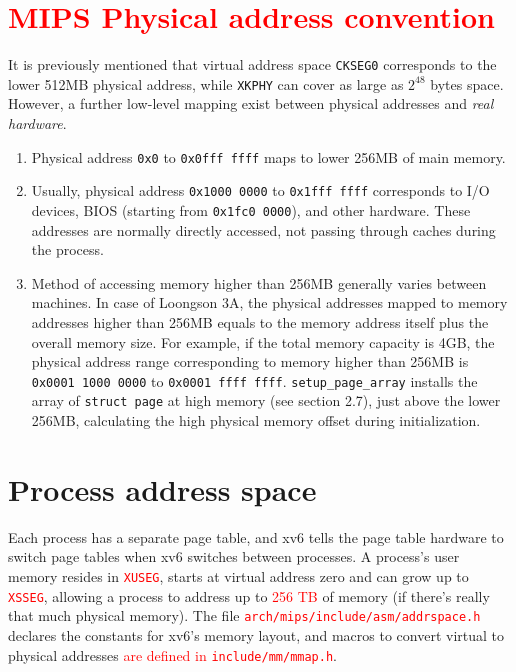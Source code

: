 \documentclass{report}
\def \hilite#1{\textcolor{red}{#1}}
\newenvironment{hilight}{\color{red}}{\color{black}}
\begin{document}
	\section{\hilite{MIPS Physical address convention}}
	\begin{hilight}
		It is previously mentioned that virtual address space \texttt{CKSEG0} corresponds to the lower
		512MB physical address, while \texttt{XKPHY} can cover as large as $2^48$ bytes space.  However,
		a further low-level mapping exist between physical addresses and \emph{real hardware}.
		
		\begin{enumerate}
			\item Physical address \texttt{0x0} to \texttt{0x0fff ffff} maps to lower
			256MB of main memory.
			\item Usually, physical address \texttt{0x1000 0000} to \texttt{0x1fff ffff} corresponds to
			I/O devices, BIOS (starting from \texttt{0x1fc0 0000}), and other hardware.  These addresses
			are normally directly accessed, not passing through caches during the process.
			\item Method of accessing memory higher than 256MB generally varies between machines.
			In case of Loongson 3A, the physical addresses mapped to memory addresses higher than
			256MB equals to the memory address itself plus the overall memory size.  For example, if the
			total memory capacity is 4GB, the physical address range corresponding to memory higher than
			256MB is \texttt{0x0001 1000 0000} to \texttt{0x0001 ffff ffff}.  \texttt{setup\_page\_array}
			\marginpar{
				\footnotesize\ttfamily
				\hilite{arch/mips/mach/\\loongson3a5/mm.c:14}
			}
			installs the array of \texttt{struct page} at high memory (see section 2.7), just above the lower 256MB,
			calculating the high physical memory offset during initialization.
		\end{enumerate}
	\end{hilight}
	
	\section{Process address space}
	Each process has a separate page table, and xv6 tells the page table hardware to
	switch page tables when xv6 switches between processes. A
	process's user memory resides in \hilite{\texttt{XUSEG}}, starts at virtual address zero 
	and can grow up to \hilite{\texttt{XSSEG}},
	allowing a process to address up to \hilite{256 TB} of memory (if there's really that much physical memory).
	The file \hilite{\texttt{arch/mips/include/asm/addrspace.h}}
	\marginpar{
		\footnotesize\ttfamily
		\hilite{arch/mips/include/\\asm/addrspace.h}
	}
	declares the constants for xv6's memory layout, and macros to convert virtual to physical
	addresses \hilite{are defined in \texttt{include/mm/mmap.h}}.
	\marginpar{
		\footnotesize\ttfamily
		\hilite{include/mm/mmap.h}
	}
	
\end{document}
